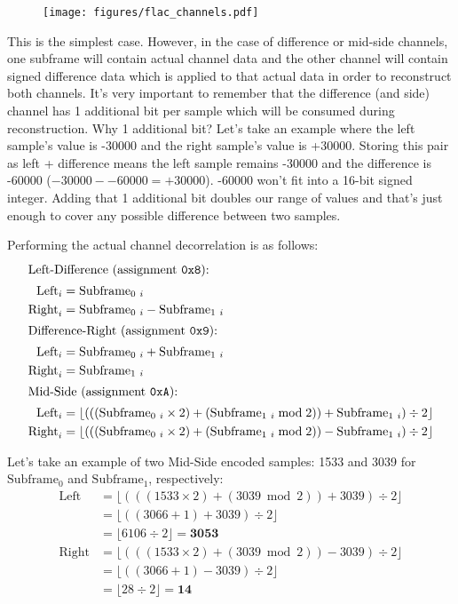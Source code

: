 \begin{figure}[h]
\texttt{[image: figures/flac\_channels.pdf]}
\end{figure}

This is the simplest case.
However, in the case of difference or mid-side channels,
one subframe will contain actual channel data and the other channel
will contain signed difference data which is applied to that actual data
in order to reconstruct both channels.
It's very important to remember that the difference (and side) channel
has 1 additional bit per sample which will be consumed during
reconstruction.
Why 1 additional bit?
Let's take an example where the left sample's value is -30000
and the right sample's value is +30000.
Storing this pair as left + difference means the left
sample remains -30000 and the difference is -60000
($-30000 - -60000 = +30000$).
-60000 won't fit into a 16-bit signed integer.
Adding that 1 additional bit doubles our range of values
and that's just enough to cover any possible difference between
two samples.

Performing the actual channel decorrelation is as follows:
\begin{align*}
\intertext{Left-Difference (assignment \texttt{0x8}):}
\text{Left}_i &= \text{Subframe}_{0~i} \\
\text{Right}_i &= \text{Subframe}_{0~i} - \text{Subframe}_{1~i} \\
\intertext{Difference-Right (assignment \texttt{0x9}):}
\text{Left}_i &= \text{Subframe}_{0~i} + \text{Subframe}_{1~i} \\
\text{Right}_i &= \text{Subframe}_{1~i} \\
\intertext{Mid-Side (assignment \texttt{0xA}):}
\text{Left}_i &= \lfloor (((\text{Subframe}_{0~i} \times 2) + (\text{Subframe}_{1~i} \bmod{2})) + \text{Subframe}_{1~i}) \div 2 \rfloor \\
\text{Right}_i &= \lfloor (((\text{Subframe}_{0~i} \times 2) + (\text{Subframe}_{1~i} \bmod{2})) - \text{Subframe}_{1~i}) \div 2 \rfloor
\end{align*}

\clearpage

Let's take an example of two Mid-Side encoded samples: 1533 and 3039
for $\text{Subframe}_0$ and $\text{Subframe}_1$, respectively:
\begin{align*}
\text{Left} &= \lfloor (((1533 \times 2) + (3039 \bmod{2})) + 3039) \div 2 \rfloor \\
&= \lfloor ((3066 + 1) + 3039) \div 2 \rfloor \\
&= \lfloor 6106 \div 2 \rfloor = \textbf{3053} \\
\text{Right} &= \lfloor (((1533 \times 2) + (3039 \bmod{2})) - 3039) \div 2 \rfloor \\
&= \lfloor ((3066 + 1) - 3039) \div 2 \rfloor \\
&= \lfloor 28 \div 2 \rfloor = \textbf{14}
\end{align*}

